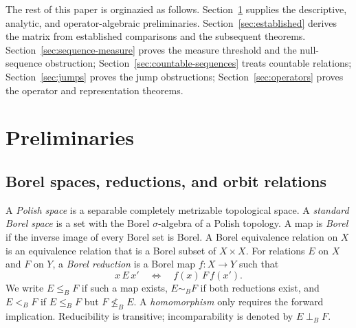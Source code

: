 \documentclass[11pt]{article}
\numberwithin{equation}{section}
\theoremstyle{definition}
\newcommand{\inc}{\mathrel{\perp_B}}
\begin{document}

The rest of this paper is orginazied as follows. Section~\ref{sec:prelim} supplies the descriptive, analytic, and
operator-algebraic preliminaries. Section~\ref{sec:established}
derives the matrix from established comparisons and the subsequent
theorems. Section~\ref{sec:sequence-measure} proves the measure
threshold and the null-sequence obstruction;
Section~\ref{sec:countable-sequences} treats countable relations;
Section~\ref{sec:jumps} proves the jump obstructions;
Section~\ref{sec:operators} proves the operator and representation
theorems.
\clearpage
\section{Preliminaries}\label{sec:prelim}

\subsection{Borel spaces, reductions, and orbit relations}
A \emph{Polish space} is a separable completely metrizable topological
space. A \emph{standard Borel space} is a set with the Borel
$\sigma$-algebra of a Polish topology. A map is \emph{Borel} if the
inverse image of every Borel set is Borel.
A Borel equivalence relation on $X$ is an equivalence relation
that is a Borel subset of $X\times X$.
For relations $E$ on $X$ and $F$ on $Y$, a \emph{Borel reduction}
is a Borel map $f:X\to Y$ such that
\[
 x\,E\,x'\quad\Longleftrightarrow\quad f(x)\,F\,f(x').
\]
We write $E\le_B F$ if such a map exists,
$E\sim_B F$ if both reductions exist, and $E<_B F$ if
$E\le_B F$ but $F\nleq_B E$. A \emph{homomorphism} only
requires the forward implication. Reducibility is transitive;
incomparability is denoted by $E\inc F$.
\end{document}
